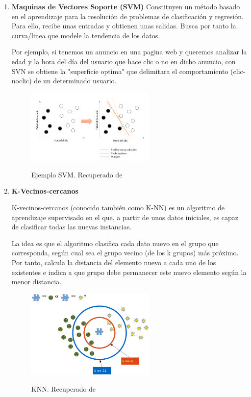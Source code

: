 \begin{enumerate}
	\item \textbf{Maquinas de Vectores Soporte (SVM)}
	Constituyen un método basado en el aprendizaje para la resolución de problemas de clasificación y regresión. Para ello, recibe unas entradas y obtienen unas salidas. Busca por tanto la curva/linea que modele la tendencia de los datos.
	
	Por ejemplo, si tenemos un anuncio en una pagina web y queremos analizar la edad y la hora del día del usuario que hace clic o no en dicho anuncio, con SVN se obtiene la "superficie optima" que delimitara el comportamiento (clic-noclic) de un determinado usuario. \cite{JANA2016}
	
		\begin{figure}[htb]
		\centering
		\caption{Ejemplo SVM. Recuperado de \protect{}}
		\includegraphics[width=0.6\textwidth]{recursos/SVM}
		\label {fig:SVM}
	\end{figure}
	\FloatBarrier
	
	\item \textbf{K-Vecinos-cercanos}
	
	K-vecinos-cercanos (conocido también como K-NN) es un algoritmo de aprendizaje supervisado en el que, a partir de unos datos iniciales, es capaz de clasificar todas las nuevas instancias.
	
	La idea es que el algoritmo clasifica cada dato nuevo en el grupo que corresponda, según cual sea el grupo vecino (de los k grupos) más próximo. Por tanto, calcula la distancia del elemento nuevo a cada uno de los existentes e indica a que grupo debe permanecer este nuevo elemento según la menor distancia.
	
	\begin{figure}[htb]
		\centering
		\caption{KNN. Recuperado de \protect{}}
		\includegraphics[width=0.6\textwidth]{recursos/k_NN}
		\label {fig:KNN}
	\end{figure}
	\FloatBarrier
	
	
\end{enumerate}

